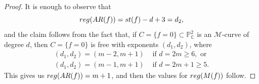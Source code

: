 \documentclass[10pt,a4paper]{amsart}
\begin{document}
\begin{proof}
It is enough to observe that 
$${\rm reg}({\rm AR}(f)) = {\rm st}(f) - d + 3 = d_{2},$$
and the claim follows from the fact that, if $C = \{f=0\} \subset \mathbb{P}^{2}_{\mathbb{C}}$ is an $\mathscr{M}$-curve of degree $d$, then $C = \{f=0\}$ is free with exponents $(d_{1},d_{2})$, where
\begin{align*}
(d_{1},d_{2}) = (m-2, m+1) & \text{ if } d=2m\geq 6, \text{ or} \\
(d_{1},d_{2}) = (m-1, m+1) & \text{ if } d=2m+1\geq 5.
\end{align*}
This gives us ${\rm reg}({\rm AR}(f)) = m+1$, and then the values for ${\rm reg}(M(f))$ follow.
\end{proof}
\end{document}
